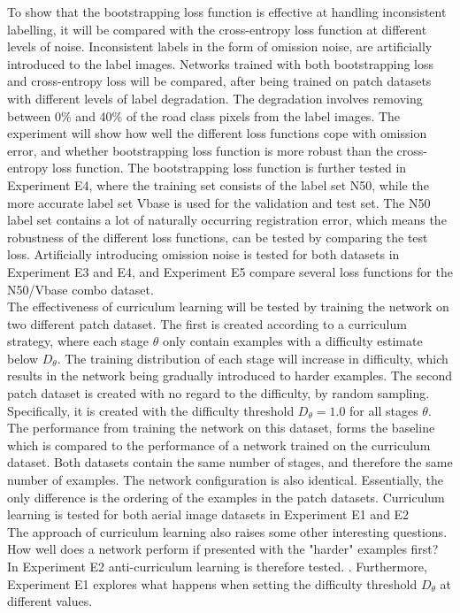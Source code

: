 To show that the bootstrapping loss function is effective at handling inconsistent labelling, it will be compared with the cross-entropy loss function at different levels of noise. Inconsistent labels in the form of omission noise, are artificially introduced to the label images. Networks trained with both bootstrapping loss and cross-entropy loss will be compared, after being trained on patch datasets with different levels of label degradation. The degradation involves removing between 0\% and 40\% of the road class pixels from the label images. The experiment will show how well the different loss functions cope with omission error, and whether bootstrapping loss function is more robust than the cross-entropy loss function. The bootstrapping loss function is further tested in Experiment E4, where the training set consists of the label set N50, while the more accurate label set Vbase is used for the validation and test set. The N50 label set contains a lot of naturally occurring registration error, which means the robustness of the different loss functions, can be tested by comparing the test loss. Artificially introducing omission noise is tested for both datasets in Experiment E3 and E4, and Experiment E5 compare several loss functions for the N50/Vbase combo dataset. \\

The effectiveness of curriculum learning will be tested by training the network on two different patch dataset. The first is created according to a curriculum strategy, where each stage $\theta$ only contain examples with a difficulty estimate below $D_\theta$. The training distribution of each stage will increase in difficulty, which results in the network being gradually introduced to harder examples. The second patch dataset is created with no regard to the difficulty, by random sampling. Specifically, it is created with the difficulty threshold $D_\theta =1.0$ for all stages $\theta$. The performance from training the network on this dataset, forms the baseline which is compared to the performance of a network trained on the curriculum dataset. Both datasets contain the same number of stages, and therefore the same number of examples. The network configuration is also identical. Essentially, the only difference is the ordering of the examples in the patch datasets. Curriculum learning is tested for both aerial image datasets in Experiment E1 and E2\\

The approach of curriculum learning also raises some other interesting questions. How well does a network perform if presented with the "harder" examples first? In Experiment E2  anti-curriculum learning is therefore tested. . Furthermore, Experiment E1 explores what happens when setting the difficulty threshold $D_\theta$ at different values.  \\

